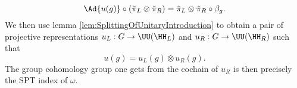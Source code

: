 \begin{equation}
\Ad{u(g)}\circ(\tilde{\pi}_L\otimes\tilde{\pi}_R)=\tilde{\pi}_L\otimes\tilde{\pi}_R\circ\beta_g.
\end{equation}
We then use lemma \ref{lem:SplittingOfUnitaryIntroduction} to obtain a pair of projective representations $u_L:G\rightarrow\UU(\HH_L)$ and $u_R:G\rightarrow\UU(\HH_R)$ such that
\begin{equation}
u(g)=u_L(g)\otimes u_R(g).
\end{equation}
The group cohomology group one gets from the cochain of $u_R$ is then precisely the SPT index of $\omega$.

\cleardoublepage

